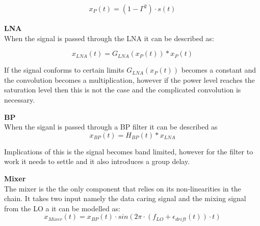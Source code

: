 \begin{align}
x_P(t) = (1-\Gamma^2)\cdot s(t) \label{eq:ref_power}
\end{align}
\begin{where}
\end{where}
\textbf{\Gls{LNA}}\\
When the signal is passed through the LNA it can be described as:

\begin{equation}
x_{LNA}(t) = G_{LNA}\left(x_P(t)\right)*x_P(t)
\end{equation}
\begin{where}
\end{where}

If the signal conforms to certain limits $G_{LNA}\left(x_P(t)\right)$ becomes a constant and the convolution becomes a multiplication, however if the power level reaches the saturation level then this is not the case and the complicated convolution is necessary. 

\textbf{\Gls{BP}}\\
When the siganl is passed through a BP filter it can be described as
\begin{equation}
x_{BP}(t) = H_{BP}(t)*x_{LNA}
\end{equation}
\begin{where}
\end{where}

Implications of this is the signal becomes band limited, however for the filter to work it needs to settle and it also introduces a group delay. 


\textbf{Mixer}\\
The mixer is the the only component that relies on its non-linearities in the chain. It takes two input namely the data caring signal and the mixing signal from the \gls{LO} a it can be modelled as:
\begin{equation}
x_{Mixer}(t) = x_{BP}(t) \cdot sin\left(2\pi\cdot (f_{LO}+\epsilon_{drift}(t)) \cdot t\right)
\end{equation}
\begin{where}
\end{where}


